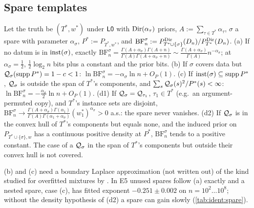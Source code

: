 \subsection{Spare templates}\label{sec:ident:spare}

\begin{proposition}\label{prop:ident:spare}
Let the truth be $(T^*,w^*)$ under $\mathord{\mathsf{L0}}$ with $\mathrm{Dir}(\alpha_\tau)$ priors, $A:=\sum_{\tau\in T^*}\alpha_\tau$, $\sigma$ a spare with parameter $\alpha_\sigma$, $P^*:=P_{T^*,w^*}$, and $\mathrm{BF}^\sigma_n:=P^{\mathrm{Dir}}_{T^*\cup\{\sigma\}}(D_n)/P^{\mathrm{Dir}}_{T^*}(D_n)$.
(a) If no datum is in $\mathrm{inst}(\sigma)$, exactly $\mathrm{BF}^\sigma_n=\frac{\Gamma(A+\alpha_\sigma)\Gamma(A+n)}{\Gamma(A)\Gamma(A+\alpha_\sigma+n)}\sim\frac{\Gamma(A+\alpha_\sigma)}{\Gamma(A)}n^{-\alpha_\sigma}$; at $\alpha_\sigma=\frac12$, $\frac12\log_2n$ bits plus a constant and the prior bits.
(b) If $\sigma$ covers data but $\mathcal{Q}_\sigma(\operatorname{supp}P^*)=1-c<1$: $\ln\mathrm{BF}^\sigma_n=-\alpha_\sigma\ln n+O_P(1)$.
(c) If $\mathrm{inst}(\sigma)\subseteq\operatorname{supp}P^*$, $\mathcal{Q}_\sigma$ is outside the span of $T^*$'s components, and $\sum_s\mathcal{Q}_\sigma(s)^2/P^*(s)<\infty$: $\ln\mathrm{BF}^\sigma_n=-\frac{\alpha_\sigma}2\ln n+O_P(1)$.
(d1) If $\mathcal{Q}_\sigma=\mathcal{Q}_{\tau_1}$, $\tau_1\in T^*$ (e.g.\ an argument-permuted copy), and $T^*$'s instance sets are disjoint, $\mathrm{BF}^\sigma_n\to\frac{\Gamma(A+\alpha_\sigma)\Gamma(\alpha_1)}{\Gamma(A)\Gamma(\alpha_1+\alpha_\sigma)}(w^*_1)^{\alpha_\sigma}>0$ a.s.: the spare never vanishes.
(d2) If $\mathcal{Q}_\sigma$ is in the convex hull of $T^*$'s components but equals none, and the induced prior on $P_{T^*\cup\{\sigma\},w}$ has a continuous positive density at $P^*$, $\mathrm{BF}^\sigma_n$ tends to a positive constant.
The case of a $\mathcal{Q}_\sigma$ in the span of $T^*$'s components but outside their convex hull is not covered.
\end{proposition}

\noindent (b) and (c) need a boundary Laplace approximation (not written out) of the kind studied for overfitted mixtures by \citet{rousseau2011asymptotic}. In E5 unused spares follow (a) exactly and a nested spare, case (c), has fitted exponent $-0.251\pm0.002$ on $n=10^2\ldots10^8$; without the density hypothesis of (d2) a spare can gain slowly (\cref{tab:ident:spare}).

